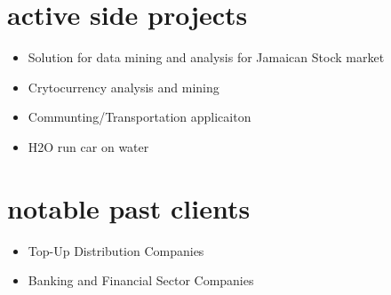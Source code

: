 \documentclass[]{friggeri-cvRS}
\begin{document}

\section{active side projects}
\begin{itemize}
	\item Solution for data mining and analysis for Jamaican Stock market 
	\item Crytocurrency analysis and mining
    \item Communting/Transportation applicaiton 
	\item H2O run car on water
\end{itemize}


\section{notable past clients}
\begin{itemize}
	\item Top-Up Distribution Companies
    	\item Banking and Financial Sector Companies
\end{itemize}

\end{document}
